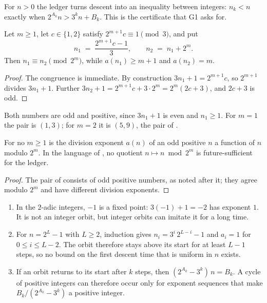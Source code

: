 For $n > 0$ the ledger turns descent into an inequality between integers: $n_k < n$ exactly when
$2^{A_k} n > 3^k n + B_k$. This is the certificate that G1 asks for.

\begin{theorem}\label{thm:split-pair}
Let $m \ge 1$, let $c \in \{1, 2\}$ satisfy $2^{m+1} c \equiv 1 \pmod 3$, and put
\[
  n_1 \;=\; \frac{2^{m+1} c - 1}{3}, \qquad n_2 \;=\; n_1 + 2^m .
\]
Then $n_1 \equiv n_2 \pmod{2^m}$, while $a(n_1) \ge m + 1$ and $a(n_2) = m$.
\end{theorem}

\begin{proof}
The congruence is immediate. By construction $3 n_1 + 1 = 2^{m+1} c$, so $2^{m+1}$ divides
$3n_1 + 1$. Further $3 n_2 + 1 = 2^{m+1} c + 3 \cdot 2^m = 2^m (2c + 3)$, and $2c + 3$ is odd.
\end{proof}

Both numbers are odd and positive, since $3n_1 + 1$ is even and $n_1 \ge 1$. For $m = 1$ the pair
is $(1, 3)$; for $m = 2$ it is $(5, 9)$, the pair of .

\begin{corollary}\label{cor:no-residue}
For no $m \ge 1$ is the division exponent $a(n)$ of an odd positive $n$ a function of $n$ modulo
$2^m$. In the language of , no quotient $n \mapsto n \bmod 2^m$ is
future-sufficient for the ledger.
\end{corollary}

\begin{proof}
The pair of  consists of odd positive numbers, as noted after it; they agree
modulo $2^m$ and have different division exponents.
\end{proof}

\begin{remark}\label{rem:collatz-paper}
\begin{enumerate}
  \item In the $2$-adic integers, $-1$ is a fixed point: $3(-1) + 1 = -2$ has exponent $1$. It is
    not an integer orbit, but integer orbits can imitate it for a long time.
  \item For $n = 2^L - 1$ with $L \ge 2$, induction gives $n_i = 3^i\, 2^{L-i} - 1$ and $a_i = 1$
    for $0 \le i \le L-2$. The orbit therefore stays above its start for at least $L - 1$ steps,
    so no bound on the first descent time that is uniform in $n$ exists.
  \item If an orbit returns to its start after $k$ steps, then $(2^{A_k} - 3^k)\, n = B_k$. A
    cycle of positive integers can therefore occur only for exponent sequences that make
    $B_k/(2^{A_k} - 3^k)$ a positive integer.
\end{enumerate}
\end{remark}


